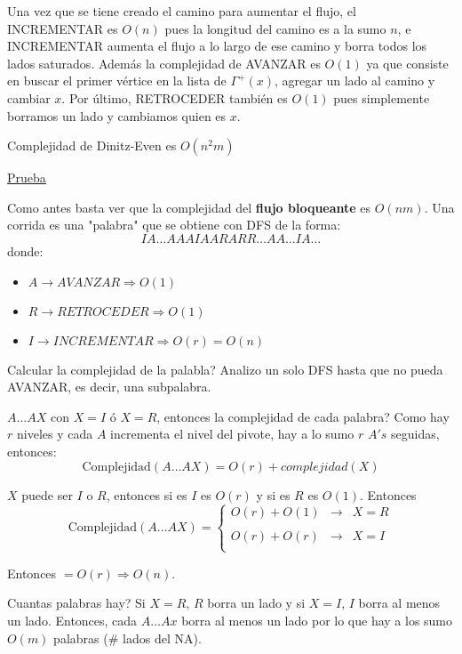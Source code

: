 \documentclass[12pt,a4paper]{article}
\begin{document}
Una vez que se tiene creado el camino para aumentar el flujo, el INCREMENTAR es 
$O(n)$ pues la longitud del camino es a la sumo $n$, e INCREMENTAR aumenta el 
flujo a lo largo de ese camino y borra todos los lados saturados. Además la 
complejidad de AVANZAR es $O(1)$ ya que consiste en buscar el primer vértice 
en la lista de $\Gamma^{+}(x)$, agregar un lado al camino y cambiar $x$. 
Por último, RETROCEDER también es $O(1)$ pues simplemente borramos un lado y 
cambiamos quien es $x$.

\begin{teorema} Complejidad de Dinitz-Even es $O(n^{2}m)$
\end{teorema}

\underline{Prueba}
\medskip

Como antes basta ver que la complejidad del \textbf{flujo bloqueante} es $O(nm)$. 
Una corrida es una "palabra" que se obtiene con DFS de la forma:
$$IA\ldots AAAIAARARR \ldots AA \ldots IA\ldots$$ 
donde:
\begin{itemize}
    \item $A \to AVANZAR \Rightarrow O(1)$
    \item $R \to RETROCEDER \Rightarrow O(1)$
    \item $I \to INCREMENTAR \Rightarrow O(r) = O(n)$
\end{itemize}

Calcular la complejidad de la palabla? Analizo un solo DFS hasta que no pueda 
AVANZAR, es decir, una subpalabra.
\medskip

$A \ldots AX$ con $X=I$ ó $X=R$, entonces la complejidad de cada palabra? Como 
hay $r$ niveles y cada $A$ incrementa el nivel del pivote, hay a lo sumo 
$r$ $A's$ seguidas, entonces:
$$\text{Complejidad}(A \ldots AX) = O(r) + complejidad(X)$$

$X$ puede ser $I$ o $R$, entonces si es $I$ es $O(r)$ y si es $R$ es $O(1)$. 
Entonces $$\text{Complejidad}(A \ldots AX)= \left\{ \begin{array}{lcc}
    O(r) + O(1) & \to & X=R \\
    \\O(r) + O(r)& \to & X=I\\
    \end{array}
    \right.$$

Entonces $=O(r) \Rightarrow O(n)$.
\medskip

Cuantas palabras hay? Si $X=R$, $R$ borra un lado y si $X=I$, $I$ borra al menos 
un lado. Entonces, cada $A \ldots Ax$ borra al menos un lado por lo que hay a los 
sumo $O(m)$ palabras ($\#$ lados del NA).
\medskip
\end{document}
